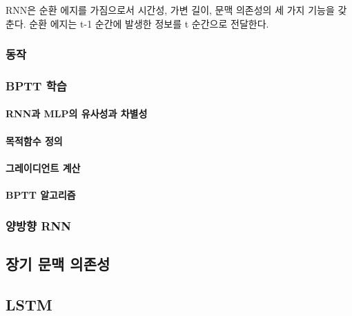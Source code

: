 \documentclass [12pt] {oblivoir}
\let\oldsubsubsection=\subsubsection
\renewcommand{\subsubsection}
{
  \filbreak
  \oldsubsubsection
}
\begin{document}
RNN은 순환 에지를 가짐으로서 시간성, 가변 길이, 문맥 의존성의 세 가지 기능을 갖춘다.
순환 에지는 t-1 순간에 발생한 정보를 t 순간으로 전달한다.

\subsubsection{동작}

\subsubsection{BPTT 학습}

\paragraph*{RNN과 MLP의 유사성과 차별성}\mbox{}

\vspace{3mm}

\paragraph*{목적함수 정의}\mbox{}

\vspace{3mm}

\paragraph*{그레이디언트 계산}\mbox{}

\vspace{3mm}

\paragraph*{BPTT 알고리즘}\mbox{}

\vspace{3mm}

\subsubsection{양방향 RNN}

\subsection{장기 문맥 의존성}

\subsection{LSTM}
\end{document}
